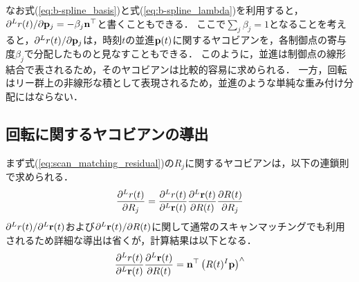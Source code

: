 なお式(\ref{eq:b-spline_basis})と式(\ref{eq:b-spline_lambda})を利用すると，$\partial {}^{L}r(t) / \partial {\bf p}_{j} = -\beta_{j} {\bf n}^{\top}$と書くこともできる．
ここで$\sum_{j} \beta_{j} = 1$となることを考えると，$\partial {}^{L}r(t) / \partial {\bf p}_{j}$は，時刻$t$の並進${\bf p}(t)$に関するヤコビアンを，各制御点の寄与度$\beta_{j}$で分配したものと見なすこともできる．
このように，並進は制御点の線形結合で表されるため，そのヤコビアンは比較的容易に求められる．
一方，回転はリー群上の非線形な積として表現されるため，並進のような単純な重み付け分配にはならない．







\subsection{回転に関するヤコビアンの導出}

まず式(\ref{eq:scan_matching_residual})の$R_{j}$に関するヤコビアンは，以下の連鎖則で求められる．
%
\begin{align}
  \frac{ \partial {}^{L}r(t) }{ \partial R_{j} }
  =
  \frac{ \partial {}^{L}r(t) }{ \partial {}^{L}{\bf r}(t) }
  \frac{ \partial {}^{L}{\bf r}(t) }{ \partial R(t) }
  \frac{ \partial R(t) }{ \partial R_{j} }
\end{align}
%
$\partial {}^{L}r(t) / \partial {}^{L}{\bf r}(t)$および$\partial {}^{L}{\bf r}(t) / \partial R(t)$に関して通常のスキャンマッチングでも利用されるため詳細な導出は省くが，計算結果は以下となる．
%
\begin{align}
  \frac{ \partial {}^{L}r(t) }{ \partial {}^{L}{\bf r}(t) }
  \frac{ \partial {}^{L}{\bf r}(t) }{ \partial R(t) }
  =
  {\bf n}^{\top} \left( R(t) {}^{I}{\bf p} \right)^{\wedge}
\end{align}
%

